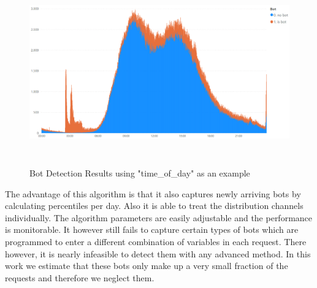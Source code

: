 \documentclass[12pt,titlepage]{article}
\begin{document}
\begin{figure}[H]
    \centerline{\includegraphics[height=8cm]{bots_day_time.png}}
\caption{Bot Detection Results using "time\_of\_day" as an example}
\label{fig:bots}
\end{figure}
\noindent
The advantage of this algorithm is that it also captures newly arriving bots by calculating percentiles per day. Also it is able to treat the distribution channels individually. The algorithm parameters are easily adjustable and the performance is monitorable. It however still fails to capture certain types of bots which are programmed to enter a different combination of variables in each request. There however, it is nearly infeasible to detect them with any advanced method. In this work we estimate that these bots only make up a very small fraction of the requests and therefore we neglect them. \\
\end{document}
